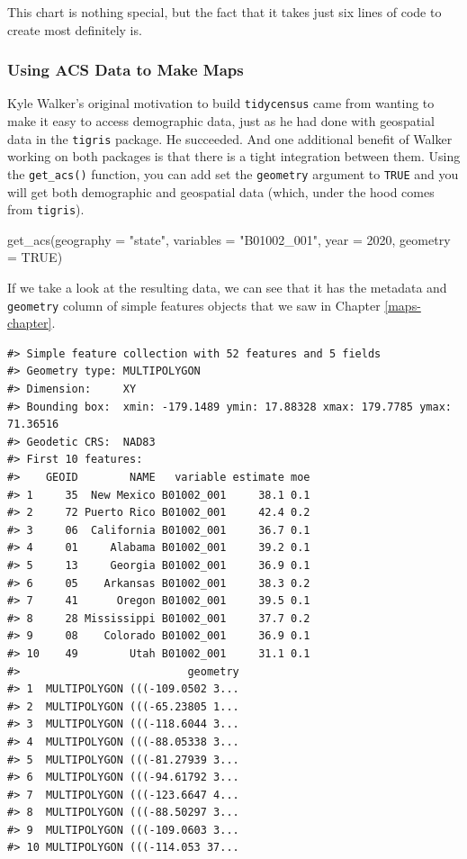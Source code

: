 \documentclass[
]{book}
\newenvironment{Shaded}{\begin{snugshade}}{\end{snugshade}}
\newcommand{\AttributeTok}[1]{\textcolor[rgb]{0.77,0.63,0.00}{#1}}
\newcommand{\ConstantTok}[1]{\textcolor[rgb]{0.00,0.00,0.00}{#1}}
\newcommand{\DecValTok}[1]{\textcolor[rgb]{0.00,0.00,0.81}{#1}}
\newcommand{\FunctionTok}[1]{\textcolor[rgb]{0.00,0.00,0.00}{#1}}
\newcommand{\NormalTok}[1]{#1}
\newcommand{\StringTok}[1]{\textcolor[rgb]{0.31,0.60,0.02}{#1}}
\begin{document}
This chart is nothing special, but the fact that it takes just six lines of code to create most definitely is.

\hypertarget{using-acs-data-to-make-maps}{%
\subsubsection*{Using ACS Data to Make Maps}\label{using-acs-data-to-make-maps}}

Kyle Walker's original motivation to build \texttt{tidycensus} came from wanting to make it easy to access demographic data, just as he had done with geospatial data in the \texttt{tigris} package. He succeeded. And one additional benefit of Walker working on both packages is that there is a tight integration between them. Using the \texttt{get\_acs()} function, you can add set the \texttt{geometry} argument to \texttt{TRUE} and you will get both demographic and geospatial data (which, under the hood comes from \texttt{tigris}).

\begin{Shaded}
\begin{Highlighting}[]
\FunctionTok{get\_acs}\NormalTok{(}\AttributeTok{geography =} \StringTok{"state"}\NormalTok{,}
        \AttributeTok{variables =} \StringTok{"B01002\_001"}\NormalTok{,}
        \AttributeTok{year =} \DecValTok{2020}\NormalTok{,}
        \AttributeTok{geometry =} \ConstantTok{TRUE}\NormalTok{) }
\end{Highlighting}
\end{Shaded}

If we take a look at the resulting data, we can see that it has the metadata and \texttt{geometry} column of simple features objects that we saw in Chapter \ref{maps-chapter}.

\begin{verbatim}
#> Simple feature collection with 52 features and 5 fields
#> Geometry type: MULTIPOLYGON
#> Dimension:     XY
#> Bounding box:  xmin: -179.1489 ymin: 17.88328 xmax: 179.7785 ymax: 71.36516
#> Geodetic CRS:  NAD83
#> First 10 features:
#>    GEOID        NAME   variable estimate moe
#> 1     35  New Mexico B01002_001     38.1 0.1
#> 2     72 Puerto Rico B01002_001     42.4 0.2
#> 3     06  California B01002_001     36.7 0.1
#> 4     01     Alabama B01002_001     39.2 0.1
#> 5     13     Georgia B01002_001     36.9 0.1
#> 6     05    Arkansas B01002_001     38.3 0.2
#> 7     41      Oregon B01002_001     39.5 0.1
#> 8     28 Mississippi B01002_001     37.7 0.2
#> 9     08    Colorado B01002_001     36.9 0.1
#> 10    49        Utah B01002_001     31.1 0.1
#>                          geometry
#> 1  MULTIPOLYGON (((-109.0502 3...
#> 2  MULTIPOLYGON (((-65.23805 1...
#> 3  MULTIPOLYGON (((-118.6044 3...
#> 4  MULTIPOLYGON (((-88.05338 3...
#> 5  MULTIPOLYGON (((-81.27939 3...
#> 6  MULTIPOLYGON (((-94.61792 3...
#> 7  MULTIPOLYGON (((-123.6647 4...
#> 8  MULTIPOLYGON (((-88.50297 3...
#> 9  MULTIPOLYGON (((-109.0603 3...
#> 10 MULTIPOLYGON (((-114.053 37...
\end{verbatim}
\end{document}

